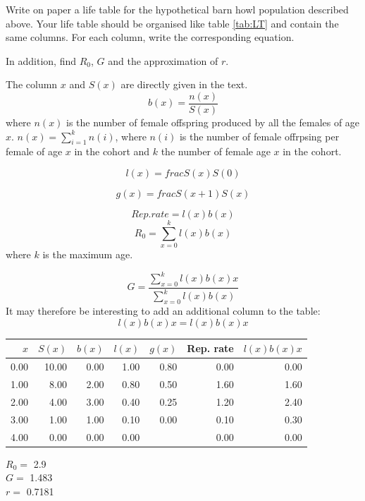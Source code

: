 \documentclass{article}\usepackage[]{graphicx}\usepackage[]{color}
\begin{document}
\begin{Exercise}[title=Life Table, label=LT, difficulty=1]
Write on paper a life table for the hypothetical barn howl population described above. Your life table should be organised like table \ref{tab:LT} and contain the same columns. For each column, write the corresponding equation. 

In addition, find $R_0$, $G$ and the approximation of $r$.
\end{Exercise}
\begin{Answer}[ref=LT]
The column $x$ and $S(x)$ are directly given in the text. 
\begin{equation}
b(x)=\frac{n(x)}{S(x)}
\end{equation}
where $n(x)$ is the number of female offspring produced by all the females of age $x$. $n(x)=\sum\limits_{i=1}^k{n(i)}$, where $n(i)$ is the number of female offrpsing per female of age $x$ in the cohort and $k$ the number of female age $x$ in the cohort.

\begin{equation}
l(x)=frac{S(x)}{S(0)}
\end{equation}

\begin{equation}
g(x)=frac{S(x+1)}{S(x)}
\end{equation}

\begin{equation}
Rep. rate=l(x)b(x)
\end{equation}
\begin{equation}
R_0=\sum\limits_{x=0}^k{l(x)b(x)}
\end{equation}
where $k$ is the maximum age. 

\begin{equation}
G=\frac{\sum\limits_{x=0}^k{l(x)b(x)x}}{\sum\limits_{x=0}^k{l(x)b(x)}}
\end{equation}
It may therefore be interesting to add an additional column to the table:
\begin{equation}
l(x)b(x)x=l(x)b(x)x
\end{equation}

{\footnotesize
\begin{tabular}{rrrrrrr}
  \toprule 
 $x$ & $S(x)$ & $b(x)$ & $l(x)$ & $g(x)$ & Rep. rate & $l(x)b(x)x$ \\
 \midrule 
 0.00 & 10.00 & 0.00 & 1.00 & 0.80 & 0.00 & 0.00 \\ 
  1.00 & 8.00 & 2.00 & 0.80 & 0.50 & 1.60 & 1.60 \\ 
  2.00 & 4.00 & 3.00 & 0.40 & 0.25 & 1.20 & 2.40 \\ 
  3.00 & 1.00 & 1.00 & 0.10 & 0.00 & 0.10 & 0.30 \\ 
  4.00 & 0.00 & 0.00 & 0.00 &  & 0.00 & 0.00 \\ 
   \bottomrule 
\end{tabular}
}



\noindent$R_0=$ 2.9 \\$G=$ 1.483 \\$r=$ 0.7181 \\


\end{Answer}
\end{document}
